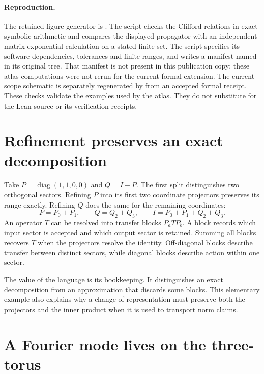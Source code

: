 \paragraph{Reproduction.}
The retained figure generator is . The script checks the Clifford relations in exact symbolic arithmetic and compares the displayed propagator with an independent matrix-exponential calculation on a stated finite set. The script specifies its software dependencies, tolerances and finite ranges, and writes a manifest named  in its original tree. That manifest is not present in this publication copy; these atlas computations were not rerun for the current formal extension. The current scope schematic is separately regenerated by  from an accepted formal receipt. These checks validate the examples used by the atlas. They do not substitute for the Lean source or its verification receipts.

\clearpage
\section{Refinement preserves an exact decomposition}

Take $P=\operatorname{diag}(1,1,0,0)$ and $Q=I-P$. The first split distinguishes two orthogonal sectors. Refining $P$ into its first two coordinate projectors preserves its range exactly. Refining $Q$ does the same for the remaining coordinates:
\[
P=P_0+P_1,\qquad Q=Q_2+Q_3,\qquad
I=P_0+P_1+Q_2+Q_3.
\]
An operator $T$ can be resolved into transfer blocks $P_aTP_b$. A block records which input sector is accepted and which output sector is retained. Summing all blocks recovers $T$ when the projectors resolve the identity. Off-diagonal blocks describe transfer between distinct sectors, while diagonal blocks describe action within one sector.

The value of the language is its bookkeeping. It distinguishes an exact decomposition from an approximation that discards some blocks. This elementary example also explains why a change of representation must preserve both the projectors and the inner product when it is used to transport norm claims.


\clearpage
\section{A Fourier mode lives on the three-torus}

